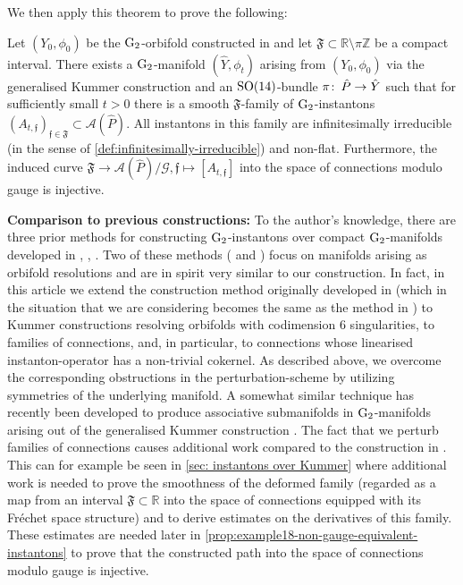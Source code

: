 \documentclass[11pt,a4paper]{scrartcl}
\newcommand{\col}{\colon \thinspace}
\newcommand{\G}{\textup{G}}
\newcommand{\SO}{\textup{SO}}
\numberwithin{equation}{section}
\theoremstyle{plain}
\theoremstyle{definition}
\theoremstyle{remark}
\begin{document}
We then apply this theorem to prove the following:
\begin{introtheorem}\label{introprop:instantons-examples}
Let $(Y_0,\phi_0)$ be the $\G_2$-orbifold constructed in \cite[Example~18]{Joyce-GeneralisedKummer2} and let $\mathfrak{F}\subset \mathbb{R}\setminus \pi \mathbb{Z}$ be a compact interval. There exists a $\G_2$-manifold $(\hat{Y},\phi_t)$ arising from $(Y_0,\phi_0)$ via the generalised Kummer construction and an $\SO(14)$-bundle $\pi\col \hat{P} \to \hat{Y}$ such that for sufficiently small $t>0$ there is a smooth $\mathfrak{F}$-family of $\G_2$-instantons $(A_{t,\mathfrak{f}})_{\mathfrak{f}\in \mathfrak{F}} \subset \mathcal{A}(\hat{P})$. All instantons in this family are infinitesimally irreducible (in the sense of \autoref{def:infinitesimally-irreducible}) and non-flat. Furthermore, the induced curve $\mathfrak{F}\to \mathcal{A}(\hat{P})/\mathcal{G}, \mathfrak{f}\mapsto [A_{t,\mathfrak{f}}]$ into the space of connections modulo gauge is injective.
\end{introtheorem}

\textbf{Comparison to previous constructions:} To the author's knowledge, there are three prior methods for constructing $\G_2$-instantons over compact $\G_2$-manifolds developed in \cite{Walpuski-InstantonsKummer}, \cite{WalpuskiSaEarp-Instantons_over_TCS}, \cite{Platt-G2Instantons}. Two of these methods (\cite{Walpuski-InstantonsKummer} and \cite{Platt-G2Instantons}) focus on manifolds arising as orbifold resolutions and are in spirit very similar to our construction. In fact, in this article we extend the construction method originally developed in \cite{Walpuski-InstantonsKummer} (which in the situation that we are considering becomes the same as the method in \cite{Platt-G2Instantons}) to Kummer constructions resolving orbifolds with codimension 6 singularities, to families of connections, and, in particular, to connections whose linearised instanton-operator has a non-trivial cokernel. As described above, we overcome the corresponding obstructions in the perturbation-scheme by utilizing symmetries of the underlying manifold. A somewhat similar technique has recently been developed to produce associative submanifolds in $\G_2$-manifolds arising out of the generalised Kummer construction \cite{DPSDTW-Associatives}. The fact that we perturb families of connections causes additional work compared to the construction in \cite{Walpuski-InstantonsKummer}. This can for example be seen in \autoref{sec: instantons over Kummer} where additional work is needed to prove the smoothness of the deformed family (regarded as a map from an interval $\mathfrak{F} \subset \mathbb{R}$ into the space of connections equipped with its Fréchet space structure) and to derive estimates on the derivatives of this family. These estimates are needed later in \autoref{prop:example18-non-gauge-equivalent-instantons} to prove that the constructed path into the space of connections modulo gauge is injective.
\end{document}
